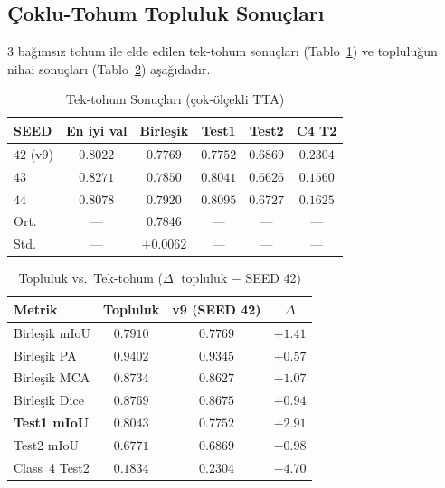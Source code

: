 \documentclass[conference,a4paper,10pt]{IEEEtran}
\begin{document}
\subsection{Çoklu-Tohum Topluluk Sonuçları}

3 bağımsız tohum ile elde edilen tek-tohum sonuçları
(Tablo~\ref{tab:seed_tek}) ve topluluğun nihai sonuçları
(Tablo~\ref{tab:ensemble_son}) aşağıdadır.

\begin{table}[!t]
\renewcommand{\arraystretch}{1.2}
\caption{Tek-tohum Sonuçları (çok-ölçekli TTA)}
\label{tab:seed_tek}
\centering
\begin{tabular}{lccccc}
\toprule
\textbf{SEED} & \textbf{En iyi val} & \textbf{Birleşik} & \textbf{Test1} & \textbf{Test2} & \textbf{C4 T2} \\
\midrule
$42$ (v9) & $0.8022$ & $0.7769$         & $0.7752$ & $\mathbf{0.6869}$ & $\mathbf{0.2304}$ \\
$43$      & $0.8271$ & $0.7850$         & $0.8041$ & $0.6626$ & $0.1560$ \\
$44$      & $0.8078$ & $\mathbf{0.7920}$ & $\mathbf{0.8095}$ & $0.6727$ & $0.1625$ \\
\midrule
Ort.       & ---     & $0.7846$ & ---     & ---     & ---     \\
Std.       & ---     & $\pm 0.0062$ & ---     & ---     & ---     \\
\bottomrule
\end{tabular}
\end{table}

\begin{table}[!t]
\renewcommand{\arraystretch}{1.2}
\caption{Topluluk vs.\ Tek-tohum ($\Delta$: topluluk $-$ SEED 42)}
\label{tab:ensemble_son}
\centering
\begin{tabular}{lccc}
\toprule
\textbf{Metrik} & \textbf{Topluluk} & \textbf{v9 (SEED 42)} & \textbf{$\Delta$} \\
\midrule
Birleşik mIoU   & $\mathbf{0.7910}$ & $0.7769$ & $+1.41$ \\
Birleşik PA     & $\mathbf{0.9402}$ & $0.9345$ & $+0.57$ \\
Birleşik MCA    & $\mathbf{0.8734}$ & $0.8627$ & $+1.07$ \\
Birleşik Dice   & $\mathbf{0.8769}$ & $0.8675$ & $+0.94$ \\
\textbf{Test1 mIoU} & $\mathbf{0.8043}$ & $0.7752$ & $\mathbf{+2.91}$ \\
Test2 mIoU      & $0.6771$          & $0.6869$ & $-0.98$ \\
Class~4 Test2   & $0.1834$          & $0.2304$ & $-4.70$ \\
\bottomrule
\end{tabular}
\end{table}
\end{document}
